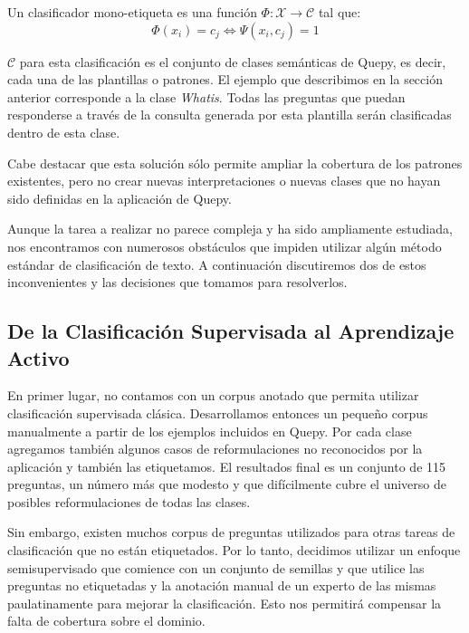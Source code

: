 \begin{definition}\label{def-clasificacion}
Un clasificador mono-etiqueta es una función $\Phi:\mathcal{X} \rightarrow \mathcal{C}$ tal que:
$$ \Phi(x_i) = c_j \Leftrightarrow \Psi(x_i, c_j) = 1 $$
\end{definition}

$\mathcal{C}$ para esta clasificación es el conjunto de clases semánticas de Quepy, es decir, cada una de las plantillas o patrones. El ejemplo que describimos en la sección anterior corresponde a la clase \textit{Whatis}. Todas las preguntas que puedan responderse a través de la consulta generada por esta plantilla serán clasificadas dentro de esta clase.

Cabe destacar que esta solución sólo permite ampliar la cobertura de los patrones existentes, pero no crear nuevas interpretaciones o nuevas clases que no hayan sido definidas en la aplicación de Quepy.


Aunque la tarea a realizar no parece compleja y ha sido ampliamente estudiada, nos encontramos con numerosos obstáculos que impiden utilizar algún método estándar de clasificación de texto. A continuación discutiremos dos de estos inconvenientes y las decisiones que tomamos para resolverlos.

\subsection{De la Clasificación Supervisada al Aprendizaje Activo}

En primer lugar, no contamos con un corpus anotado que permita utilizar clasificación supervisada clásica. Desarrollamos entonces un pequeño corpus manualmente a partir de los ejemplos incluidos en Quepy. Por cada clase agregamos también algunos casos de reformulaciones no reconocidos por la aplicación y también las etiquetamos. El resultados final es un conjunto de 115 preguntas, un número más que modesto y que difícilmente cubre el universo de posibles reformulaciones de todas las clases.

Sin embargo, existen muchos corpus de preguntas utilizados para otras tareas de clasificación que no están etiquetados. Por lo tanto, decidimos utilizar un enfoque semisupervisado que comience con un conjunto de semillas y que utilice las preguntas no etiquetadas y la anotación manual de un experto de las mismas paulatinamente para mejorar la clasificación. Esto nos permitirá compensar la falta de cobertura sobre el dominio.

